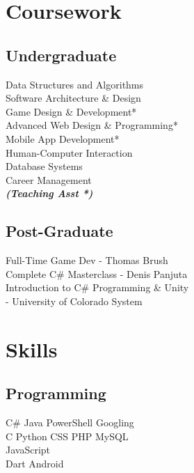 \documentclass[]{pratham-resume-openfont}
\begin{document}
\begin{minipage}[t]{0.34\textwidth}

\section{Coursework}
\subsection{Undergraduate}
Data Structures and Algorithms \\
Software Architecture \& Design\\
Game Design \& Development* \\
Advanced Web Design \& Programming* \\
Mobile App Development* \\
Human-Computer Interaction \\
Database Systems \\
Career Management \\
{\footnotesize \textit{\textbf{(Teaching Asst *) }}} \\

\sectionsep
\subsection{Post-Graduate}
Full-Time Game Dev - Thomas Brush \\
Complete C\# Masterclass - Denis Panjuta \\
Introduction to C\# Programming \& Unity \\
 - University of Colorado System \\


\section{Skills}
\subsection{Programming}
C\# \textbullet{} Java \textbullet{} PowerShell \textbullet{} Googling \\ 
C \textbullet{} Python \textbullet{} CSS \textbullet{} PHP \textbullet{} MySQL \\ \textbullet{} JavaScript \\
Dart \textbullet{} Android 
\sectionsep

%
%

\end{minipage} 
\end{document}
